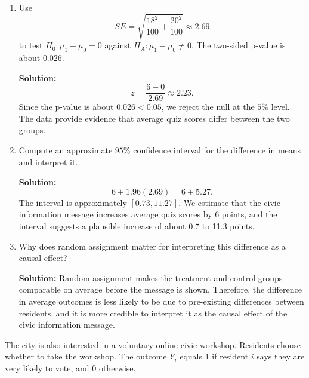 \documentclass[11pt]{exam}
\begin{document}
\begin{questions}
\begin{enumerate}[leftmargin = 0.5cm, label = (\alph*), rightmargin = 0.2cm]
    \begin{solutionorbox}[3.5cm]
    \textbf{Solution:}
    \[
    \bar Y_1-\bar Y_0=68-62=6.
    \]
    The treatment-group average is 6 points higher than the control-group average.
    \end{solutionorbox}

    \item Use
    \[
    SE=\sqrt{\frac{18^2}{100}+\frac{20^2}{100}}\approx 2.69
    \]
    to test $H_0:\mu_1-\mu_0=0$ against $H_A:\mu_1-\mu_0\ne 0$. The two-sided p-value is about $0.026$.

    \begin{solutionorbox}[6.3cm]
    \textbf{Solution:}
    \[
    z=\frac{6-0}{2.69}\approx 2.23.
    \]
    Since the p-value is about $0.026<0.05$, we reject the null at the $5\%$ level. The data provide evidence that average quiz scores differ between the two groups.
    \end{solutionorbox}

    \item Compute an approximate $95\%$ confidence interval for the difference in means and interpret it.

    \begin{solutionorbox}[6cm]
    \textbf{Solution:}
    \[
    6 \pm 1.96(2.69)=6\pm 5.27.
    \]
    The interval is approximately $[0.73,11.27]$. We estimate that the civic information message increases average quiz scores by 6 points, and the interval suggests a plausible increase of about 0.7 to 11.3 points.
    \end{solutionorbox}

    \item Why does random assignment matter for interpreting this difference as a causal effect?

    \begin{solutionorbox}[4.8cm]
    \textbf{Solution:} Random assignment makes the treatment and control groups comparable on average before the message is shown. Therefore, the difference in average outcomes is less likely to be due to pre-existing differences between residents, and it is more credible to interpret it as the causal effect of the civic information message.
    \end{solutionorbox}
\end{enumerate}

\newpage
\question[2.5]
The city is also interested in a voluntary online civic workshop. Residents choose whether to take the workshop. The outcome $Y_i$ equals 1 if resident $i$ says they are very likely to vote, and 0 otherwise.


\end{questions}
\end{document}
